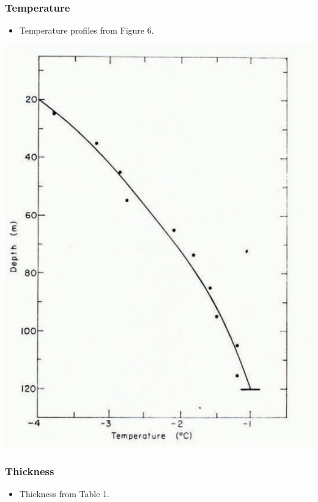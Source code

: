 \documentclass[article,a4paper,times,11pt,twoside]{article}
\begin{document}
\subsubsection{Temperature}
\label{sec:orgd09c7b2}

\begin{itemize}
\item Temperature profiles from \textcite{colbeck_1979} Figure 6.
\end{itemize}

\begin{center}
\includegraphics[width=.9\linewidth]{isua_11/isua_11.png}
\end{center}

\subsubsection{Thickness}
\label{sec:org9f0b139}

\begin{itemize}
\item Thickness from \textcite{colbeck_1979} Table 1.
\end{itemize}
\end{document}
